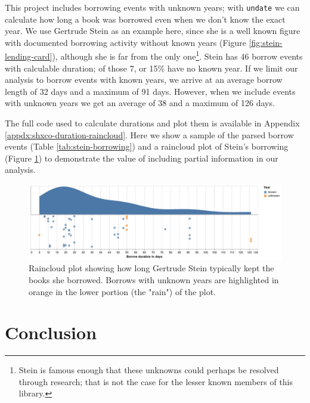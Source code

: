 \documentclass{anthology-ch}         %
\begin{document}
This project includes borrowing events with unknown years; with
\texttt{undate} we can calculate how long a book was borrowed even when
we don't know the exact year. We use Gertrude Stein as an example here, since she is a well known figure with documented borrowing activity without known years (Figure \ref{fig:stein-lending-card}), although she is far from the only one\footnote{Stein is famous enough that these unknowns could perhaps be resolved through research; that is not the case for the lesser known members of this library.}. Stein has 46 borrow events with calculable duration; of those 7, or 15\% have no known year.  If we limit our analysis to borrow events with known years, we arrive at an average borrow length of 32 days and a maximum of 91 days. However, when we include events with unknown years we get an average of 38 and a maximum of 126 days.

The full code used to calculate durations and plot them is available in Appendix \ref{appdx:shxco-duration-raincloud}.  Here we show a sample of the parsed borrow events (Table \ref{tab:stein-borrowing}) and a raincloud plot of Stein's borrowing (Figure \ref{fig:stein-borrow-raincloud}) to demonstrate the value of including partial information in our analysis. 


\begin{figure}[t!]
  \centering
  \includegraphics[width=\linewidth]{assets/shxco_stein_borrows.pdf}
  \caption{Raincloud plot showing how long Gertrude Stein typically kept the books
she borrowed.  Borrows with unknown years are highlighted in orange in the lower portion (the "rain") of the plot. }
  \label{fig:stein-borrow-raincloud}
\end{figure}

\section{Conclusion}
\end{document}
